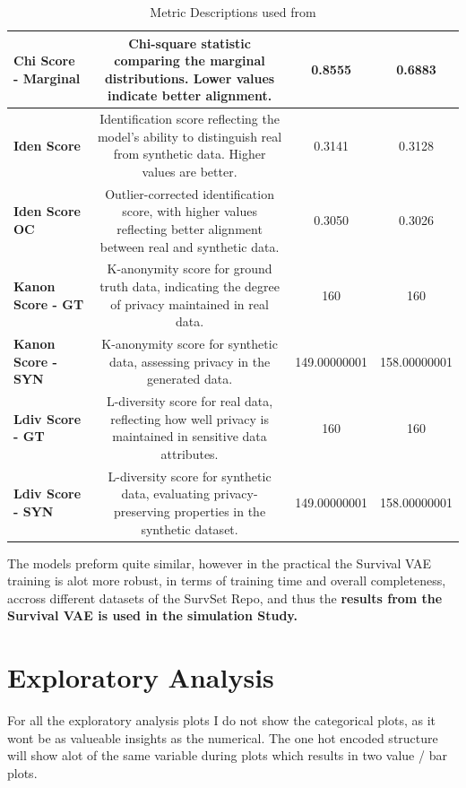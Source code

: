 \begin{landscape}
\begin{table}[H]
\begin{tabular}{|l|>{\tiny}c|c|c|}
    \textbf{Chi Score - Marginal}  & Chi-square statistic comparing the marginal distributions. Lower values indicate better alignment. & 0.8555           & 0.6883           \\ \hline
    \textbf{Iden Score}            & Identification score reflecting the model's ability to distinguish real from synthetic data. Higher values are better. & 0.3141           & 0.3128           \\ \hline
    \textbf{Iden Score OC}         & Outlier-corrected identification score, with higher values reflecting better alignment between real and synthetic data. & 0.3050           & 0.3026           \\ \hline
    \textbf{Kanon Score - GT}      & K-anonymity score for ground truth data, indicating the degree of privacy maintained in real data. & 160              & 160              \\ \hline
    \textbf{Kanon Score - SYN}     & K-anonymity score for synthetic data, assessing privacy in the generated data. & 149.00000001     & 158.00000001     \\ \hline
    \textbf{Ldiv Score - GT}       & L-diversity score for real data, reflecting how well privacy is maintained in sensitive data attributes. & 160     & 160     \\ \hline
    \textbf{Ldiv Score - SYN}      & L-diversity score for synthetic data, evaluating privacy-preserving properties in the synthetic dataset. & 149.00000001              & 158.00000001              \\ \hline
    \end{tabular}
    \caption{Metric Descriptions used from \parencite{qian_synthcity_2023}}
    \label{tab:metrics_description}
\end{table}
\end{landscape}
\clearpage
\noindent The models preform quite similar, however in the practical the Survival VAE training is alot more robust, in terms of training time and overall completeness, accross different datasets of the SurvSet Repo, and thus the \textbf{results from the Survival VAE is used in the simulation Study.}
\section{Exploratory Analysis}
For all the exploratory analysis plots I do not show the categorical plots, as it wont be as valueable insights as the numerical. The one hot encoded structure will show alot of the same variable during plots which results in two value / bar plots.


